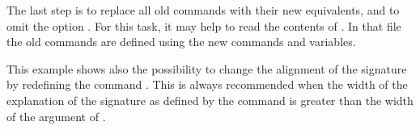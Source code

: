 The last step is to replace all old commands with their new
equivalents, and to omit the option . For this task,
it may help to read the contents of .  In that file
the old commands are defined using the new commands and variables.

This example shows also the possibility to change the alignment of the
signature by redefining the command .  This is
always recommended when the width of the explanation of the signature as
defined by the command
\PParameter{\dots} is greater than the
width of the argument of .


\endinput

